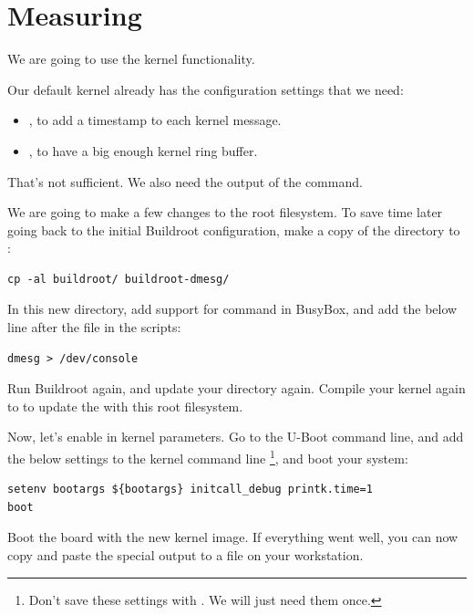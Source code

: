 
\section{Measuring}

We are going to use the kernel  functionality.

Our default kernel already has the configuration settings that we need:
\begin{itemize}
\item {}, to add a timestamp to each kernel
message.
\item {}, to have a big enough kernel ring buffer.
\end{itemize}

That's not sufficient. We also need the output of the 
command.

We are going to make a few changes to the root filesystem. To save time
later going back to the initial Buildroot configuration, make a copy
of the  directory to :

\begin{verbatim}
cp -al buildroot/ buildroot-dmesg/
\end{verbatim}

In this new directory, add support for  command in BusyBox,
and add the below line after the  file in the
 scripts:

\begin{verbatim}
dmesg > /dev/console
\end{verbatim}

Run Buildroot again, and update your
 directory again. Compile your
kernel again to to update the  with this root filesystem.

Now, let's enable  in kernel parameters. Go to
the U-Boot command line, and add the below settings to the kernel command line
\footnote{Don't save these settings with . We
will just need them once.}, and boot your system:
\begin{verbatim}
setenv bootargs ${bootargs} initcall_debug printk.time=1
boot
\end{verbatim}

Boot the board with the new kernel image. If everything went well,
you can now copy and paste the special  output to
a  file on your workstation.

